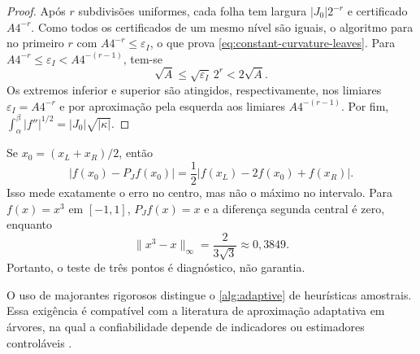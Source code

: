 \begin{proof}
Após $r$ subdivisões uniformes, cada folha tem largura $|J_0|2^{-r}$ e
certificado $A4^{-r}$. Como todos os certificados de um mesmo nível são
iguais, o algoritmo para no primeiro $r$ com $A4^{-r}\le\varepsilon_I$, o
que prova \eqref{eq:constant-curvature-leaves}. Para
$A4^{-r}\le\varepsilon_I<A4^{-(r-1)}$, tem-se
\[
 \sqrt{A}\le \sqrt{\varepsilon_I}\,2^r<2\sqrt{A}.
\]
Os extremos inferior e superior são atingidos, respectivamente, nos limiares
$\varepsilon_I=A4^{-r}$ e por aproximação pela esquerda aos limiares
$A4^{-(r-1)}$. Por fim,
$\int_\alpha^\beta |f''|^{1/2}=|J_0|\sqrt{|\kappa|}$.
\end{proof}

\begin{remark}\label{rem:second-difference}
Se $x_0=(x_L+x_R)/2$, então
\[
 |f(x_0)-P_Jf(x_0)|=\frac12|f(x_L)-2f(x_0)+f(x_R)|.
\]
Isso mede exatamente o erro no centro, mas não o máximo no intervalo. Para $f(x)=x^3$ em $[-1,1]$, $P_Jf(x)=x$ e a diferença segunda central é zero, enquanto
\[
 \|x^3-x\|_\infty=\frac{2}{3\sqrt3}\approx0{,}3849.
\]
Portanto, o teste de três pontos é diagnóstico, não garantia.
\end{remark}

O uso de majorantes rigorosos distingue o \cref{alg:adaptive} de heurísticas amostrais. Essa exigência é compatível com a literatura de aproximação adaptativa em árvores, na qual a confiabilidade depende de indicadores ou estimadores controláveis \citep{cohen2001,binev2004}.
